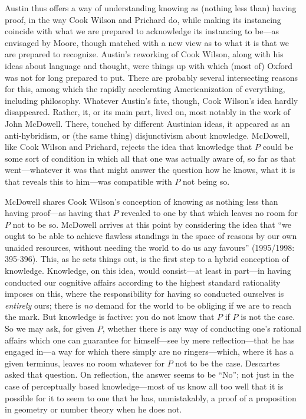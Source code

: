 Austin thus offers a way of understanding knowing as (nothing less than) having proof, in the way Cook Wilson and Prichard do, while making its instancing coincide with what we are prepared to acknowledge its instancing to be---as envisaged by Moore, though matched with a new view as to what it is that we are prepared to recognize. Austin’s reworking of Cook Wilson, along with his ideas about language and thought, were things up with which (most of) Oxford was not for long prepared to put. There are probably several intersecting reasons for this, among which the rapidly accelerating Americanization of everything, including philosophy. Whatever Austin’s fate, though, Cook Wilson’s idea hardly disappeared. Rather, it, or its main part, lived on, most notably in the work of John McDowell. There, touched by different Austinian ideas, it appeared as an anti-hybridism, or (the same thing) disjunctivism about knowledge. McDowell, like Cook Wilson and Prichard, rejects the idea that knowledge that \( P \) could be some sort of condition in which all that one was actually aware of, so far as that went---whatever it was that might answer the question how he knows, what it is that reveals this to him---was compatible with \( P \) not being so.

McDowell shares Cook Wilson’s conception of knowing as nothing less than having proof---as having that \( P \) revealed to one by that which leaves no room for \( P \) not to be so. McDowell arrives at this point by considering the idea that ``we ought to be able to achieve flawless standings in the space of reasons by our own unaided resources, without needing the world to do us any favours'' (1995/1998: 395-396). This, as he sets things out, is the first step to a hybrid conception of knowledge. Knowledge, on this idea, would consist---at least in part---in having conducted our cognitive affairs according to the highest standard rationality imposes on this, where the responsibility for having so conducted ourselves is \emph{entirely} ours; there is \emph{no} demand for the world to be obliging if we are to reach the mark. But knowledge is factive: you do not know that \( P \) if \( P \) is not the case. So we may ask, for given \( P \), whether there is any way of conducting one’s rational affairs which one can guarantee for himself---see by mere reflection---that he has engaged in---a way for which there simply are no ringers---which, where it has a given terminus, leaves no room whatever for \( P \) not to be the case. Descartes asked that question. On reflection, the answer seems to be ``No''; not just in the case of perceptually based knowledge---most of us know all too well that it is possible for it to seem to one that he has, unmistakably, a proof of a proposition in geometry or number theory when he does not.

